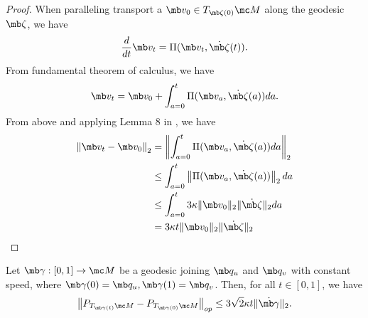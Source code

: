 \begin{proof}
When paralleling transport a $\mb v_0 \in T_{\mb\zeta(0)}\mc M$ along the geodesic $\mb\zeta$, we have
\begin{equation}
    \frac{d}{dt} \mb v_t = \Pi(\mb v_t, \Dot{\mb\zeta}(t)).
\end{equation}
From fundamental theorem of calculus, we have
\begin{equation}
    \mb v_t = \mb v_0 + \int_{a=0}^t \Pi(\mb v_a, \Dot{\mb\zeta}(a)) da.
\end{equation}
From above and applying Lemma 8 in \cite{yan2023tpopt}, we have 
\begin{equation}
    \begin{aligned}
        \left\| \mb v_t - \mb v_0 \right\|_2
        &= \left\| \int_{a=0}^t \Pi(\mb v_a, \Dot{\mb\zeta}(a)) da \right\|_2\\
        &\leq \int_{a=0}^t \left\|\Pi(\mb v_a, \Dot{\mb\zeta}(a))\right\|_2 da\\
        &\leq { \int_{a=0}^t 3\kappa \|\mb v_0\|_2 \|\Dot{\mb\zeta}\|_2da}\\
        &= 3\kappa t \|\mb v_0\|_2 \|\Dot{\mb\zeta}\|_2 
    \end{aligned}
\end{equation}
\end{proof}

\begin{lemma}\label{lemma:tangnet space diff bound}
    Let $\mb\gamma:[0,1] \rightarrow \mc M$ be a geodesic joining $\mb q_u$ and $\mb q_v$ with constant speed, where $\mb\gamma(0)=\mb q_u, \mb\gamma(1)=\mb q_v$. Then, for all $t\in[0,1]$, we have
    \begin{equation}
    \left\| P_{T_{\mb\gamma(t)} \mc M} - P_{T_{\mb\gamma(0)} \mc M}\right\|_{op}
    \leq 3\sqrt{2} \kappa t \|\Dot{\mb\gamma}\|_2  .
    \end{equation}
\end{lemma}


